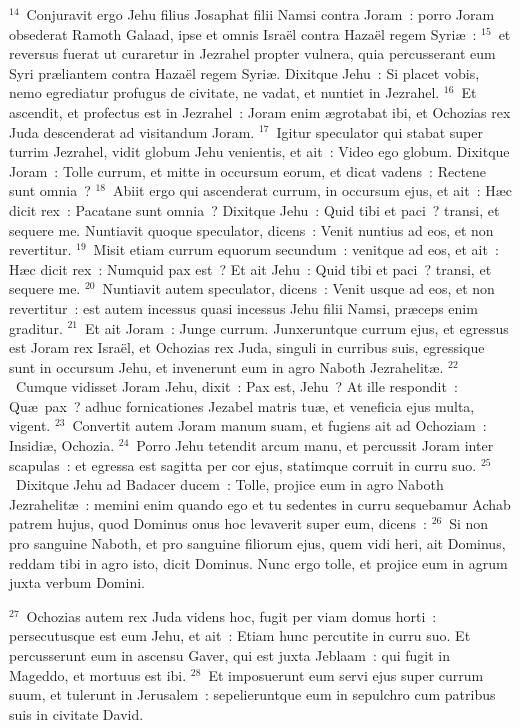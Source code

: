 ${}^{14}$~Conjuravit ergo Jehu filius Josaphat filii Namsi contra Joram~: porro Joram obsederat Ramoth Galaad, ipse et omnis Isra\"el contra Haza\"el regem Syri\ae~:
${}^{15}$~et reversus fuerat ut curaretur in Jezrahel propter vulnera, quia percusserant eum Syri pr\ae liantem contra Haza\"el regem Syri\ae . Dixitque Jehu~: Si placet vobis, nemo egrediatur profugus de civitate, ne vadat, et nuntiet in Jezrahel.
${}^{16}$~Et ascendit, et profectus est in Jezrahel~: Joram enim \ae grotabat ibi, et Ochozias rex Juda descenderat ad visitandum Joram.
${}^{17}$~Igitur speculator qui stabat super turrim Jezrahel, vidit globum Jehu venientis, et ait~: Video ego globum. Dixitque Joram~: Tolle currum, et mitte in occursum eorum, et dicat vadens~: Rectene sunt omnia~?
${}^{18}$~Abiit ergo qui ascenderat currum, in occursum ejus, et ait~: H\ae c dicit rex~: Pacatane sunt omnia~? Dixitque Jehu~: Quid tibi et paci~? transi, et sequere me. Nuntiavit quoque speculator, dicens~: Venit nuntius ad eos, et non revertitur.
${}^{19}$~Misit etiam currum equorum secundum~: venitque ad eos, et ait~: H\ae c dicit rex~: Numquid pax est~? Et ait Jehu~: Quid tibi et paci~? transi, et sequere me.
${}^{20}$~Nuntiavit autem speculator, dicens~: Venit usque ad eos, et non revertitur~: est autem incessus quasi incessus Jehu filii Namsi, pr\ae ceps enim graditur.
${}^{21}$~Et ait Joram~: Junge currum. Junxeruntque currum ejus, et egressus est Joram rex Isra\"el, et Ochozias rex Juda, singuli in curribus suis, egressique sunt in occursum Jehu, et invenerunt eum in agro Naboth Jezrahelit\ae .
${}^{22}$~Cumque vidisset Joram Jehu, dixit~: Pax est, Jehu~? At ille respondit~: Qu\ae\ pax~? adhuc fornicationes Jezabel matris tu\ae , et veneficia ejus multa, vigent.
${}^{23}$~Convertit autem Joram manum suam, et fugiens ait ad Ochoziam~: Insidi\ae , Ochozia.
${}^{24}$~Porro Jehu tetendit arcum manu, et percussit Joram inter scapulas~: et egressa est sagitta per cor ejus, statimque corruit in curru suo.
${}^{25}$~Dixitque Jehu ad Badacer ducem~: Tolle, projice eum in agro Naboth Jezrahelit\ae~: memini enim quando ego et tu sedentes in curru sequebamur Achab patrem hujus, quod Dominus onus hoc levaverit super eum, dicens~:
${}^{26}$~Si non pro sanguine Naboth, et pro sanguine filiorum ejus, quem vidi heri, ait Dominus, reddam tibi in agro isto, dicit Dominus. Nunc ergo tolle, et projice eum in agrum juxta verbum Domini.


${}^{27}$~Ochozias autem rex Juda videns hoc, fugit per viam domus horti~: persecutusque est eum Jehu, et ait~: Etiam hunc percutite in curru suo. Et percusserunt eum in ascensu Gaver, qui est juxta Jeblaam~: qui fugit in Mageddo, et mortuus est ibi.
${}^{28}$~Et imposuerunt eum servi ejus super currum suum, et tulerunt in Jerusalem~: sepelieruntque eum in sepulchro cum patribus suis in civitate David.



